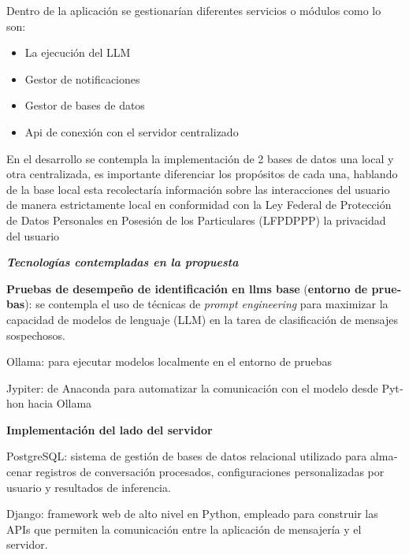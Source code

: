 \documentclass{article}
\begin{document}
\foreignlanguage{spanish}{Dentro de la aplicaci{\'{o}}n se gestionar{\'{i}}an diferentes servicios o m{\'{o}}dulos como lo son:}
\begin{itemize}
\item \foreignlanguage{spanish}{La ejecuci{\'{o}}n del LLM}
\item \foreignlanguage{spanish}{Gestor de notificaciones}
\item \foreignlanguage{spanish}{Gestor de bases de datos}
\item \foreignlanguage{spanish}{Api de conexi{\'{o}}n con el servidor centralizado}
\end{itemize}
\foreignlanguage{spanish}{En el desarrollo se contempla la implementaci{\'{o}}n de 2 bases de datos una local y otra centralizada, es importante diferenciar los prop{\'{o}}sitos de cada una, hablando de la base local esta recolectar{\'{i}}a informaci{\'{o}}n sobre las interacciones del usuario de manera estrictamente local en conformidad con la Ley Federal de Protecci{\'{o}}n de Datos Personales en Posesi{\'{o}}n de los Particulares (LFPDPPP) la privacidad del usuario}

\foreignlanguage{spanish}{\textbf{\textit{Tecnolog{\'{i}}as contempladas en la propuesta}}}

\foreignlanguage{spanish}{\textbf{Pruebas de desempe{\~{n}}o de identificaci{\'{o}}n en llms base }}\foreignlanguage{spanish}{(}\foreignlanguage{spanish}{\textbf{entorno de pruebas}}\foreignlanguage{spanish}{): se contempla el uso de t{\'{e}}cnicas de }\foreignlanguage{spanish}{\textit{prompt engineering}}\foreignlanguage{spanish}{ para maximizar la capacidad de modelos de lenguaje (LLM) en la tarea de clasificaci{\'{o}}n de mensajes sospechosos.}

\foreignlanguage{spanish}{Ollama: para ejecutar modelos localmente en el entorno de pruebas}

\foreignlanguage{spanish}{Jypiter: de Anaconda para automatizar la comunicaci{\'{o}}n con el modelo desde Python hacia Ollama}

\foreignlanguage{spanish}{\textbf{Implementaci{\'{o}}n del lado del servidor}}

\foreignlanguage{spanish}{PostgreSQL: sistema de gesti{\'{o}}n de bases de datos relacional utilizado para almacenar registros de conversaci{\'{o}}n procesados, configuraciones personalizadas por usuario y resultados de inferencia.}

\foreignlanguage{spanish}{Django: framework web de alto nivel en Python, empleado para construir las APIs que permiten la comunicaci{\'{o}}n entre la aplicaci{\'{o}}n de mensajer{\'{i}}a y el servidor.}
\end{document}
